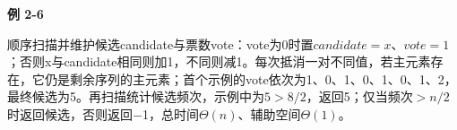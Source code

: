 {\color{ink}\bfseries 例 2-6}\par\vspace{1bp}顺序扫描并维护候选candidate与票数vote：vote为0时置\(candidate=\allowbreak{}x\)、\(vote=\allowbreak{}1\)；否则x与candidate相同则加1，不同则减1。每次抵消一对不同值，若主元素存在，它仍是剩余序列的主元素；首个示例的vote依次为1、0、1、0、1、0、1、2，最终候选为5。再扫描统计候选频次，示例中为\(5>\allowbreak{}8/\allowbreak{}2\)，返回5；仅当频次\(>\allowbreak{}n/\allowbreak{}2\)时返回候选，否则返回\(-\)1，总时间\(\Theta (n)\)、辅助空间\(\Theta (1)\)。
